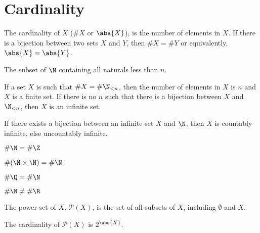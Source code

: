 \documentclass{article}
\begin{document}
\section{Cardinality}
\nopagebreak
\begin{multicols}{2}
    \begin{definition}[Cardinality]
        The cardinality of $X$ ($\#X$ or $\abs{X}$), is the number of elements in $X$.
        If there is a bijection between two sets $X$ and $Y$,
        then $\#X=\#Y$ or equivalently, $\abs{X} = \abs{Y}$.
    \end{definition}
    \begin{definition}[$\N_{<n}$]
        The subset of $\N$ containing all naturals less than $n$.
    \end{definition}
    \begin{definition}
        If a set $X$ is such that $\#X=\#\N_{<n}$,
        then the number of elements in $X$ is $n$ and $X$ is a finite set.
        If there is no $n$ such that there is a bijection between $X$ and $\N_{<n}$,
        then $X$ is an infinite set.
    \end{definition}
    \begin{definition}
        If there exists a bijection between an infinite set $X$ and $\N$,
        then $X$ is countably infinite, else uncountably infinite.
    \end{definition}
    \columnbreak
    \begin{theorem}$\#\N = \#\Z$\end{theorem}
    \begin{theorem}$\#(\N\times\N) = \#\N$\end{theorem}
    \begin{theorem}$\#\Q = \#\N$\end{theorem}
    \begin{theorem}$\#\N \ne \#\R$\end{theorem}
    \begin{definition}
        The power set of $X$, $\mathscr{P}(X)$, is the set of all subsets of $X$,
        including $\emptyset$ and $X$.
    \end{definition}
    \begin{theorem}
        The cardinality of $\mathscr{P}(X)$ is $2^{\abs{X}}$.
    \end{theorem}
\end{multicols}
%
\end{document}

